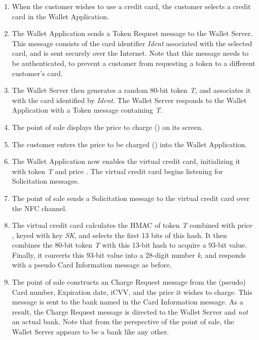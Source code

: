 \begin{enumerate}
\item When the customer wishes to use a credit card, the customer selects a credit card in the Wallet Application.

\item The Wallet Application sends a Token Request message to the Wallet Server.
    This message consists of the card identifier \emph{Ident} associated with the selected card, and is sent securely over the Internet.
    Note that this message needs to be authenticated, to prevent a customer from requesting a token to a different customer's card.

\item The Wallet Server then generates a random 80-bit token \emph{T}, and associates it with the card identified by \emph{Ident}.
    The Wallet Server responds to the Wallet Application with a Token message containing \emph{T}.

\item The point of sale displays the price to charge () on its screen.

\item The customer enters the price to be charged () into the Wallet Application.

\item The Wallet Application now enables the virtual credit card, initializing it with token \emph{T} and price .
    The virtual credit card begins listening for Solicitation messages.

\item The point of sale sends a Solicitation message to the virtual credit card over the NFC channel.

\item The virtual credit card calculates the HMAC of token \emph{T} combined with price , keyed with key \emph{SK}, and selects the first 13 bits of this hash.
    It then combines the 80-bit token \emph{T} with this 13-bit hash to acquire a 93-bit value.
    Finally, it converts this 93-bit value into a 28-digit number \emph{k}, and responds with a pseudo Card Information message as before.

\item The point of sale constructs an Charge Request message from the (pseudo) Card number, Expiration date, iCVV, and the price it wishes to charge.
    This message is sent to the bank named in the Card Information message.
    As a result, the Charge Request message is directed to the Wallet Server and \emph{not} an actual bank.
    Note that from the perspective of the point of sale, the Wallet Server appears to be a bank like any other.


\end{enumerate}
